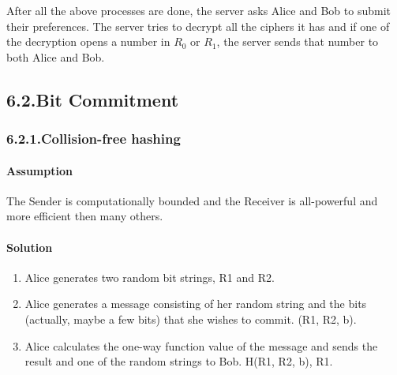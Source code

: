 \documentclass{article}
\begin{document}
\noindent{}After all the above processes are done, the server asks Alice and Bob to submit their preferences. The server tries to decrypt all the ciphers it has and if one of the decryption opens a number in $R_{0}$ or $R_{1}$, the server sends that number to both Alice and Bob.%

\subsection{6.2.\hspace*{0.5em}Bit Commitment}\label{sec-bit-commitment}%

\subsubsection{6.2.1.\hspace*{0.5em}Collision-free hashing}\label{sec-collision-free-hashing}%

\paragraph{Assumption}\label{sec-assumption}%

\noindent{}The Sender is computationally bounded and the Receiver is all-powerful and more efficient then many others.%

\paragraph{Solution}\label{sec-solution}%

\begin{enumerate}[noitemsep,topsep=\mdcompacttopsep]%

\item{}Alice generates two random bit strings, R1 and R2.  %

\item{}Alice generates a message consisting of her random string and the bits (actually, maybe a few bits) that she wishes to commit. (R1, R2, b).%

\item{}Alice calculates the one-way function value of the message and sends the result and one of the random strings to Bob. H(R1, R2, b), R1.%
\end{enumerate}%
\end{document}
